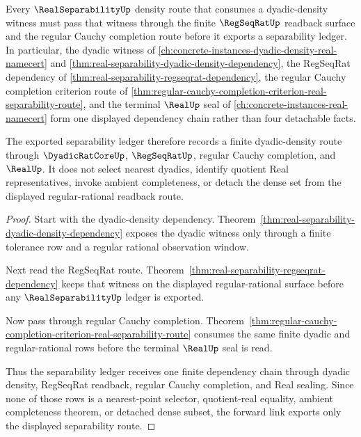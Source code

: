 \begin{theorem}
\label{thm:real-separability-dyadic-density-forward-link}
Every $\RealSeparabilityUp$ density route that consumes a dyadic-density witness must pass that witness through the finite $\RegSeqRatUp$ readback surface and the regular Cauchy completion route before it exports a separability ledger. In particular, the dyadic witness of \autoref{ch:concrete-instances-dyadic-density-real-namecert} and \autoref{thm:real-separability-dyadic-density-dependency}, the RegSeqRat dependency of \autoref{thm:real-separability-regseqrat-dependency}, the regular Cauchy completion criterion route of \autoref{thm:regular-cauchy-completion-criterion-real-separability-route}, and the terminal $\RealUp$ seal of \autoref{ch:concrete-instances-real-namecert} form one displayed dependency chain rather than four detachable facts.

The exported separability ledger therefore records a finite dyadic-density route through $\DyadicRatCoreUp$, $\RegSeqRatUp$, regular Cauchy completion, and $\RealUp$. It does not select nearest dyadics, identify quotient Real representatives, invoke ambient completeness, or detach the dense set from the displayed regular-rational readback route.
\end{theorem}
\begin{proof}
Start with the dyadic-density dependency. Theorem~\ref{thm:real-separability-dyadic-density-dependency} exposes the dyadic witness only through a finite tolerance row and a regular rational observation window.

Next read the RegSeqRat route. Theorem~\ref{thm:real-separability-regseqrat-dependency} keeps that witness on the displayed regular-rational surface before any $\RealSeparabilityUp$ ledger is exported.

Now pass through regular Cauchy completion. Theorem~\ref{thm:regular-cauchy-completion-criterion-real-separability-route} consumes the same finite dyadic and regular-rational rows before the terminal $\RealUp$ seal is read.

Thus the separability ledger receives one finite dependency chain through dyadic density, RegSeqRat readback, regular Cauchy completion, and Real sealing. Since none of those rows is a nearest-point selector, quotient-real equality, ambient completeness theorem, or detached dense subset, the forward link exports only the displayed separability route.
\end{proof}
